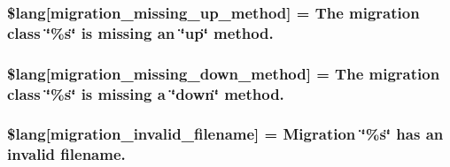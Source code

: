\subsubsection[{\$lang}]{\setlength{\rightskip}{0pt plus 5cm}\$lang\mbox{[}\textquotesingle{}migration\+\_\+missing\+\_\+up\+\_\+method\textquotesingle{}\mbox{]} = \textquotesingle{}The migration class \char`\"{}\%s\char`\"{} is missing an \char`\"{}up\char`\"{} method.\textquotesingle{}}\label{_admin_2system_2language_2english_2migration__lang_8php_a4bc9c60a4f078d1845d1d72370c363e8}
\hypertarget{_admin_2system_2language_2english_2migration__lang_8php_a6e835ce0b327b8ea1df42bfc7a59f1cd}{}
\subsubsection[{\$lang}]{\setlength{\rightskip}{0pt plus 5cm}\$lang\mbox{[}\textquotesingle{}migration\+\_\+missing\+\_\+down\+\_\+method\textquotesingle{}\mbox{]} = \textquotesingle{}The migration class \char`\"{}\%s\char`\"{} is missing {\bf a} \char`\"{}down\char`\"{} method.\textquotesingle{}}\label{_admin_2system_2language_2english_2migration__lang_8php_a6e835ce0b327b8ea1df42bfc7a59f1cd}
\hypertarget{_admin_2system_2language_2english_2migration__lang_8php_a75ef7572f25674e4dd1e36a0d61080fa}{}
\subsubsection[{\$lang}]{\setlength{\rightskip}{0pt plus 5cm}\$lang\mbox{[}\textquotesingle{}migration\+\_\+invalid\+\_\+filename\textquotesingle{}\mbox{]} = \textquotesingle{}Migration \char`\"{}\%s\char`\"{} has an invalid filename.\textquotesingle{}}\label{_admin_2system_2language_2english_2migration__lang_8php_a75ef7572f25674e4dd1e36a0d61080fa}
